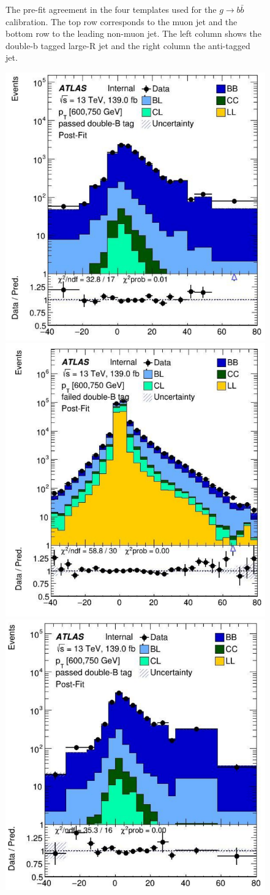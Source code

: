 \documentclass[10pt,a4paper]{book}
\begin{document}
\begin{figure}
    \caption{The pre-fit agreement in the four templates used for the $g\rightarrow b \bar{b}$ calibration. The top row corresponds to the muon jet and the bottom row to the leading non-muon jet. The left column shows the double-b tagged large-R jet and the right column the anti-tagged jet.}
    \label{fig:prefit}
\end{figure}

\begin{figure}
    \centering
    \includegraphics[width=0.485\linewidth]{ftag/postfit_600-750_sd0/muon_pass.png}
    \includegraphics[width=0.485\linewidth]{ftag/postfit_600-750_sd0/muon_fail.png} \\
     \includegraphics[width=0.485\linewidth]{ftag/postfit_600-750_sd0/nonmuon_pass.png}

\end{figure}
\end{document}
